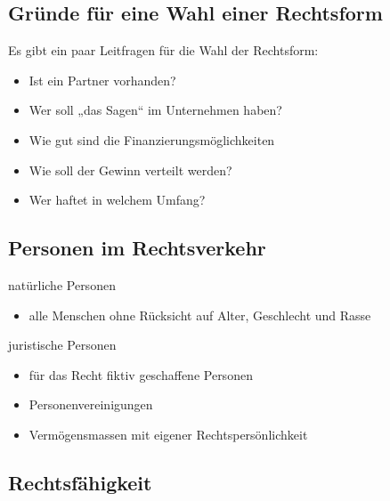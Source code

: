 \documentclass[]{article}
\begin{document}
\subsection{Gründe für eine Wahl einer Rechtsform}

Es gibt ein paar Leitfragen für die Wahl der Rechtsform:

\begin{itemize}
	\item Ist ein Partner vorhanden?
	\item Wer soll „das Sagen“ im Unternehmen haben?
	\item Wie gut sind die Finanzierungsmöglichkeiten
	\item Wie soll der Gewinn verteilt werden?
	\item Wer haftet in welchem Umfang?
\end{itemize}



\subsection{Personen im Rechtsverkehr}

\begin{minipage}[t]{0.45\textwidth}
	natürliche Personen
	\begin{itemize}
		\item alle Menschen ohne Rücksicht auf Alter, Geschlecht und Rasse
	\end{itemize}
\end{minipage}
\hfill
\begin{minipage}[t]{0.45\textwidth}
	juristische Personen
	\begin{itemize}
		\item für das Recht fiktiv geschaffene Personen
		\item Personenvereinigungen
		\item Vermögensmassen mit eigener Rechtspersönlichkeit
	\end{itemize}
\end{minipage}

\subsection{Rechtsfähigkeit}
\end{document}
